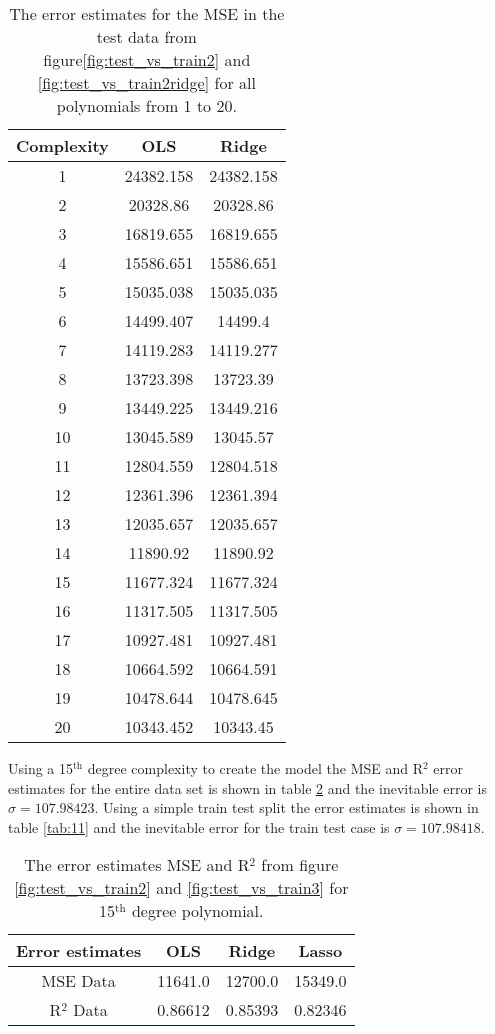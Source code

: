 \documentclass[uio,jmp,amsmath,amssymb,reprint,nofootinbib]{revtex4-1}
\numberwithin{equation}{section}
\begin{document}
\begin{table}
\begin{tabular}{|c|c|c|}\hline
Complexity & OLS & Ridge\\ \hline
1 & 24382.158 & 24382.158 \\ \hline
2 & 20328.86 & 20328.86 \\ \hline
3 & 16819.655 & 16819.655 \\ \hline
4 & 15586.651 & 15586.651 \\ \hline
5 & 15035.038 & 15035.035 \\ \hline
6 & 14499.407 & 14499.4 \\ \hline
7 & 14119.283 & 14119.277 \\ \hline
8 & 13723.398 & 13723.39 \\ \hline
9 & 13449.225 & 13449.216 \\ \hline
10 & 13045.589 & 13045.57 \\ \hline
11 & 12804.559 & 12804.518 \\ \hline
12 & 12361.396 & 12361.394 \\ \hline
13 & 12035.657 & 12035.657 \\ \hline
14 & 11890.92 & 11890.92 \\ \hline
15 & 11677.324 & 11677.324 \\ \hline
16 & 11317.505 & 11317.505 \\ \hline
17 & 10927.481 & 10927.481 \\ \hline
18 & 10664.592 & 10664.591 \\ \hline
19 & 10478.644 & 10478.645 \\ \hline
20 & 10343.452 & 10343.45 \\ \hline
\end{tabular}
\caption{The error estimates for the MSE in the test data from figure\ref{fig:test_vs_train2} and \ref{fig:test_vs_train2ridge} for all polynomials from 1 to 20.}
\label{tab:09}
\end{table}

Using a 15\(^\text{th}\) degree complexity to create the model the MSE and R\(^2\) error estimates for the entire data set is shown in table \ref{tab:10} and the inevitable error is \(\sigma = 107.98423\). Using a simple train test split the error estimates is shown in table \ref{tab:11} and the inevitable error for the train test case is \(\sigma = 107.98418\).

\begin{table}
\begin{tabular}{|c|c|c|c|}\hline
Error estimates & OLS & Ridge & Lasso\\ \hline
MSE Data & 11641.0 & 12700.0 & 15349.0 \\ \hline
R\(^2\) Data & 0.86612 & 0.85393 & 0.82346 \\ \hline
\end{tabular}
\caption{The error estimates MSE and R\(^2\) from figure \ref{fig:test_vs_train2} and \ref{fig:test_vs_train3} for 15\(^\text{th}\) degree polynomial.}
\label{tab:10}
\end{table}
\end{document}
